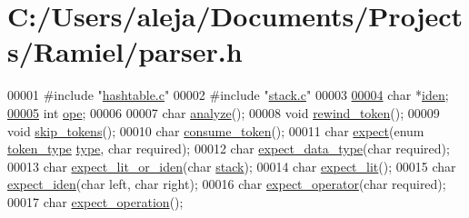 \hypertarget{parser_8h_source}{}\section{C\+:/\+Users/aleja/\+Documents/\+Projects/\+Ramiel/parser.h}

\begin{DoxyCode}
00001 \textcolor{preprocessor}{#include "\mbox{\hyperlink{hashtable_8c}{hashtable.c}}"}
00002 \textcolor{preprocessor}{#include "\mbox{\hyperlink{stack_8c}{stack.c}}"}
00003 
\mbox{\hyperlink{parser_8h_a92510da84feeae721d37072fa91b350b}{00004}} \textcolor{keywordtype}{char} *\mbox{\hyperlink{parser_8h_a92510da84feeae721d37072fa91b350b}{iden}};
\mbox{\hyperlink{parser_8h_a85f564232fa9eb864bf2c69e5c4fc124}{00005}} \textcolor{keywordtype}{int} \mbox{\hyperlink{parser_8h_a85f564232fa9eb864bf2c69e5c4fc124}{ope}};
00006 
00007 \textcolor{keywordtype}{char} \mbox{\hyperlink{parser_8h_ab8e262381abb5c1e8f9f60852381b46b}{analyze}}();
00008 \textcolor{keywordtype}{void} \mbox{\hyperlink{parser_8h_af0e71bcb4174649d6bbeacd85f541a0c}{rewind\_token}}();
00009 \textcolor{keywordtype}{void} \mbox{\hyperlink{parser_8h_af28390e9a9a85304112b885d17309ccd}{skip\_tokens}}();
00010 \textcolor{keywordtype}{char} \mbox{\hyperlink{parser_8h_aef9ddda616297a42c549608a2182293a}{consume\_token}}();
00011 \textcolor{keywordtype}{char} \mbox{\hyperlink{parser_8h_af7dc467eed15caf818332c1b225e4d51}{expect}}(\textcolor{keyword}{enum} \mbox{\hyperlink{tokens_8c_afe5ef662303b6b710ea6ee1a944bad0d}{token\_type}} \mbox{\hyperlink{structht__item_a0c6169f5c94682132bbbe974784559e6}{type}}, \textcolor{keywordtype}{char} required);
00012 \textcolor{keywordtype}{char} \mbox{\hyperlink{parser_8h_a9ff93d577df1415857dfba2c3959da84}{expect\_data\_type}}(\textcolor{keywordtype}{char} required);
00013 \textcolor{keywordtype}{char} \mbox{\hyperlink{parser_8h_a9f0e4ae8bffd096605ec27a3c90ec51e}{expect\_lit\_or\_iden}}(\textcolor{keywordtype}{char} \mbox{\hyperlink{structstack}{stack}});
00014 \textcolor{keywordtype}{char} \mbox{\hyperlink{parser_8h_af9a8c2686d508b84e7ecdc0bef925812}{expect\_lit}}();
00015 \textcolor{keywordtype}{char} \mbox{\hyperlink{parser_8h_a2644e22300d855b464dc9b1a74e2ca23}{expect\_iden}}(\textcolor{keywordtype}{char} left, \textcolor{keywordtype}{char} right);
00016 \textcolor{keywordtype}{char} \mbox{\hyperlink{parser_8h_ae105b811c4f03fbab3d1901ca031ce6c}{expect\_operator}}(\textcolor{keywordtype}{char} required);
00017 \textcolor{keywordtype}{char} \mbox{\hyperlink{parser_8h_a12397dfec2ce19c111a7ca9e36fb1cab}{expect\_operation}}();

\end{DoxyCode}
